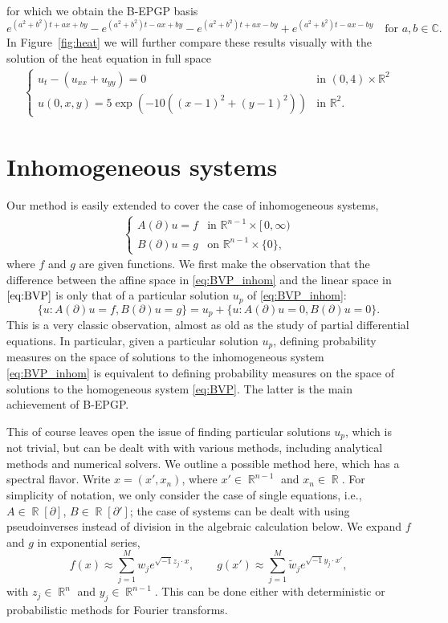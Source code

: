 \documentclass{article} %
\theoremstyle{plain}
\theoremstyle{definition}
\theoremstyle{remark}
\DeclareMathOperator*{\R}{\mathbb{R}}
\newcommand{\CC}{\mathbb{C}}
\newcommand{\RR}{\mathbb{R}}
\begin{document}
for which we obtain the B-EPGP basis
$$
e^{(a^2+b^2)t+ax+by}-e^{(a^2+b^2)t-ax+by}-e^{(a^2+b^2)t+ax-by}+e^{(a^2+b^2)t-ax-by}\quad\text{for }a,b\in\CC.
$$
In Figure~\ref{fig:heat} we will further compare these results visually with the solution of the heat equation in full space
\begin{align*}
    \begin{cases}
        u_{t}-(u_{xx}+u_{yy})=0&\text{in }(0,4)\times\RR^2\\
        u(0,x,y)= 5\exp (-10((x-1)^2+(y-1)^2))&\text{in }\RR^2.
    \end{cases}
\end{align*}


\section{Inhomogeneous systems}\label{sec:inhom}
Our method is easily extended to cover the case of inhomogeneous systems,
\begin{align}\label{eq:BVP_inhom}
      \begin{cases}
        A(\partial)u=f&\text{in }\RR^{n-1}\times[\,0,\infty)\\
    B(\partial)u=g&\text{on }\RR^{n-1}\times\{0\},
   \end{cases}
\end{align}
where $f$ and $g$ are given functions. We first make the observation that the difference between the affine space in \eqref{eq:BVP_inhom} and the linear space in $\eqref{eq:BVP}$ is only that of a particular solution $u_p$ of \eqref{eq:BVP_inhom}:
$$
\{u\colon A(\partial)u=f,B(\partial)u=g\}=u_p+\{u\colon A(\partial)u=0,B(\partial)u=0\}.
$$
This is a very classic observation, almost as old as the study of partial differential equations. In particular, given a particular solution $u_p$, defining probability measures on the space of solutions to the inhomogeneous system \eqref{eq:BVP_inhom} is equivalent to defining probability measures on the space of solutions to the homogeneous system \eqref{eq:BVP}. The latter is the main achievement of B-EPGP.

This of course leaves open the issue of finding particular solutions $u_p$, which is not trivial, but can be dealt with with various methods, including analytical methods and numerical solvers.
We outline a possible method here, which has a spectral flavor. Write $x=(x',x_n)$, where $x'\in\R^{n-1}$ and $x_n\in\R$. For simplicity of notation, we only consider the case of single equations, i.e., $A\in\R[\partial]$, $B\in\R[\partial']$; the case of systems can be dealt with using pseudoinverses instead of division in the algebraic calculation below.  We expand $f$ and $g$ in exponential series,
$$
f(x)\approx\sum_{j=1}^M w_je^{\sqrt{-1}z_j\cdot x},\qquad g(x')\approx\sum_{j=1}^M  \tilde w_j e^{\sqrt{-1}y_j\cdot x'},
$$
with $z_j\in\R^n$ and $y_j\in\R^{n-1}$. This can be done either with deterministic or probabilistic methods for Fourier transforms. %
\end{document}
